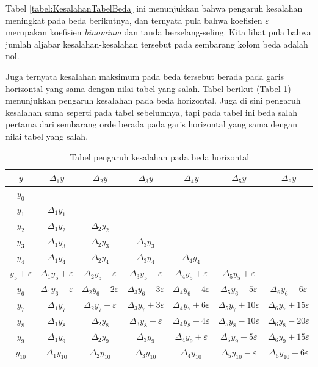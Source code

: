 Tabel \ref{tabel:KesalahanTabelBeda} ini menunjukkan bahwa pengaruh kesalahan meningkat pada beda berikutnya, dan ternyata pula bahwa koefisien $\varepsilon$ merupakan koefisien \textit{binomium} dan tanda berselang-seling. Kita lihat pula bahwa jumlah aljabar kesalahan-kesalahan tersebut pada sembarang kolom beda adalah nol.

Juga ternyata kesalahan maksimum pada beda tersebut berada pada garis horizontal yang sama dengan nilai tabel yang salah. Tabel berikut (Tabel \ref{tabel:PengaruhKesalahanBedaHorizon}) menunjukkan pengaruh kesalahan pada beda horizontal. Juga di sini pengaruh kesalahan sama seperti pada tabel sebelumnya, tapi pada tabel ini beda salah pertama dari sembarang orde berada pada garis horizontal yang sama dengan nilai tabel yang salah.

\begin{table}[!htbp]
\centering
\caption{Tabel pengaruh kesalahan pada beda horizontal}
\label{tabel:PengaruhKesalahanBedaHorizon}
\begin{tabular}{@{}|c|c|c|c|c|c|c|@{}}
\hline
$y$			& $\Delta_1 y$			& $\Delta_2 y$			& $\Delta_3 y$			& $\Delta_4 y$			& $\Delta_5 y$			& $\Delta_6 y$\\[1ex]
\hline
$y_0$			&				&				&				&				&			&\\[1ex]
$y_1$			& $\Delta_1 y_1$		&				&				&				&			&\\[1ex]
$y_2$			& $\Delta_1 y_2$		& $\Delta_2 y_2$		&				&				&			&\\[1ex]
$y_3$			& $\Delta_1 y_3$		& $\Delta_2 y_3$		& $\Delta_3 y_3$		&				&			&\\[1ex]
$y_4$			& $\Delta_1 y_4$		& $\Delta_2 y_4$		& $\Delta_3 y_4$		& $\Delta_4 y_4$			&			&\\[1ex]
$y_5 + \varepsilon$	& $\Delta_1 y_5 + \varepsilon$	& $\Delta_2 y_5 + \varepsilon$	& $\Delta_3 y_5 + \varepsilon$	& $\Delta_4 y_5 + \varepsilon$	& $\Delta_5 y_5 + \varepsilon$	&\\[1ex]
$y_6$			& $\Delta_1 y_6 - \varepsilon$	& $\Delta_2 y_6 - 2\varepsilon$	& $\Delta_3 y_6 - 3\varepsilon$	& $\Delta_4 y_6 - 4\varepsilon$	& $\Delta_5 y_6 - 5\varepsilon$	& $\Delta_6 y_6 - 6\varepsilon$\\[1ex]
$y_7$			& $\Delta_1 y_7$		& $\Delta_2 y_7 + \varepsilon$	& $\Delta_3 y_7 + 3\varepsilon$	& $\Delta_4 y_7 + 6\varepsilon$	& $\Delta_5 y_7 + 10\varepsilon$	& $\Delta_6 y_7 + 15\varepsilon$\\[1ex]
$y_8$			& $\Delta_1 y_8$		& $\Delta_2 y_8$	& $\Delta_3 y_8 - \varepsilon$	& $\Delta_4 y_8 - 4\varepsilon$	& $\Delta_5 y_8 - 10\varepsilon$	& $\Delta_6 y_8 - 20\varepsilon$\\[1ex]
$y_9$			& $\Delta_1 y_9$		& $\Delta_2 y_9$		& $\Delta_3 y_9$		& $\Delta_4 y_9 + \varepsilon$	& $\Delta_5 y_9 + 5\varepsilon$	& $\Delta_6 y_9 + 15\varepsilon$\\[1ex]
$y_{10}$			& $\Delta_1 y_{10}$		& $\Delta_2 y_{10}$		& $\Delta_3 y_{10}$		& $\Delta_4 y_{10}$		& $\Delta_5 y_{10} - \varepsilon$	& $\Delta_6 y_{10} - 6\varepsilon$\\[1ex] \hline
\end{tabular}
\end{table}

